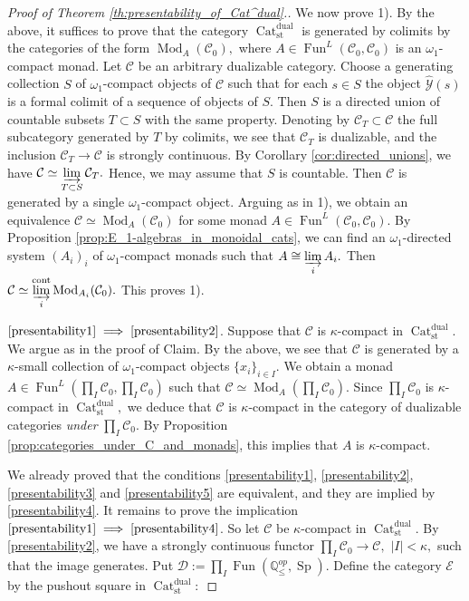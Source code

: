 \documentclass[11pt,leqno]{amsart}
\newcommand{\Implies}[2]{$\text{\ref{#1}}\implies\text{\ref{#2}}$}
\numberwithin{equation}{section}
\def\Q{\mathbb{Q}}
\newcommand{\indlim}[1][]{\mathop{\varinjlim}\limits_{#1}}
\newcommand{\Cat}{\operatorname{Cat}}
\newcommand{\cont}{\operatorname{cont}}
\newcommand{\st}{\operatorname{st}}
\newcommand{\dual}{\operatorname{dual}}
\newcommand{\cD}{{\mathcal D}}
\newcommand{\cC}{{\mathcal C}}
\newcommand{\cE}{{\mathcal E}}
\newcommand{\cY}{{\mathcal Y}}
\newcommand{\Fun}{\operatorname{Fun}}
\newcommand{\Sp}{\operatorname{Sp}}
\newcommand{\Mod}{\operatorname{Mod}}
\begin{document}
\begin{proof}[Proof of Theorem \ref{th:presentability_of_Cat^dual}.]
We now prove 1). By the above, it suffices to prove that the category $\Cat_{\st}^{\dual}$ is generated by colimits by the categories of the form $\Mod_A(\cC_0),$ where $A\in\Fun^{L}(\cC_0,\cC_0)$ is an $\omega_1$-compact monad. Let $\cC$ be an arbitrary dualizable category. Choose a generating collection $S$ of $\omega_1$-compact objects of $\cC$ such that for each $s\in S$ the object $\hat{\cY}(s)$ is a formal colimit of a sequence of objects of $S.$ Then $S$ is a directed union of countable subsets $T\subset S$ with the same property. Denoting by $\cC_T\subset\cC$ the full subcategory generated by $T$ by colimits, we see that $\cC_T$ is dualizable, and the inclusion $\cC_T\to\cC$ is strongly continuous. By Corollary \ref{cor:directed_unions}, we have $\cC\simeq\indlim[T\subset S]\cC_T.$ Hence, we may assume that $S$ is countable. Then $\cC$ is generated by a single $\omega_1$-compact object. Arguing as in 1), we obtain an equivalence $\cC\simeq\Mod_A(\cC_0)$ for some monad $A\in\Fun^{L}(\cC_0,\cC_0).$ By Proposition \ref{prop:E_1-algebras_in_monoidal_cats}, we can find an $\omega_1$-directed system $(A_i)_i$ of $\omega_1$-compact monads such that $A\cong\indlim[i]A_i.$ Then $\cC\simeq\indlim[i]^{\cont}\Mod_{A_i}(\cC_0).$ This proves 1).

\Implies{presentability1}{presentability2}. Suppose that $\cC$ is $\kappa$-compact in $\Cat_{\st}^{\dual}.$ We argue as in the proof of Claim. By the above, we see that $\cC$ is generated by a $\kappa$-small collection of $\omega_1$-compact objects $\{x_i\}_{i\in I}.$ We obtain a monad $A\in\Fun^{L}(\prod\limits_I \cC_0,\prod\limits_I \cC_0)$ such that $\cC\simeq\Mod_A(\prod\limits_I \cC_0).$ Since $\prod\limits_I \cC_0$ is $\kappa$-compact in $\Cat_{\st}^{\dual},$ we deduce that $\cC$ is $\kappa$-compact in the category of dualizable categories {\it under} $\prod\limits_I \cC_0.$ By Proposition \ref{prop:categories_under_C_and_monads}, this implies that $A$ is $\kappa$-compact. 

We already proved that the conditions \ref{presentability1}, \ref{presentability2}, \ref{presentability3} and \ref{presentability5} are equivalent, and they are implied by \ref{presentability4}. It remains to prove the implication \Implies{presentability1}{presentability4}. So let $\cC$ be $\kappa$-compact in $\Cat_{\st}^{\dual}.$ By \ref{presentability2}, we have a strongly continuous functor $\prod\limits_I\cC_0\to\cC,$ $|I|<\kappa,$ such that the image generates. Put $\cD:=\prod\limits_I\Fun(\Q_{\leq}^{op},\Sp).$ Define the category $\cE$ by the pushout square in $\Cat_{\st}^{\dual}:$


\end{proof}
\end{document}
